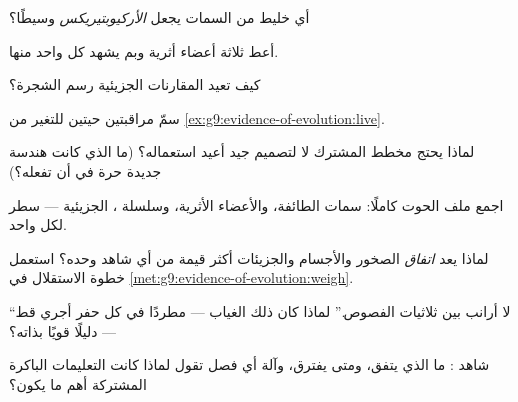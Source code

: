 \begin{exercise}[$\star$]\label{exo:g9:evidence-of-evolution:3}
أي خليط من السمات يجعل \emph{الأركيوبتيريكس} وسيطًا؟
\end{exercise}

\begin{exercise}[$\star$]\label{exo:g9:evidence-of-evolution:4}
أعط ثلاثة أعضاء أثرية وبم يشهد كل واحد منها.
\end{exercise}

\begin{exercise}[$\star$]\label{exo:g9:evidence-of-evolution:5}
كيف تعيد المقارنات الجزيئية رسم الشجرة؟
\end{exercise}

\begin{exercise}[$\star$]\label{exo:g9:evidence-of-evolution:6}
سمّ مراقبتين حيتين للتغير من
\cref{ex:g9:evidence-of-evolution:live}.
\end{exercise}

\begin{exercise}[$\star\star$]\label{exo:g9:evidence-of-evolution:7}
لماذا يحتج مخطط  المشترك  لا لتصميم جيد
أعيد استعماله؟ (ما الذي كانت هندسة جديدة حرة في أن
تفعله؟)
\end{exercise}

\begin{exercise}[$\star\star$]\label{exo:g9:evidence-of-evolution:8}
اجمع ملف الحوت كاملًا: سمات الطائفة، والأعضاء الأثرية،
وسلسلة ،  الجزيئية --- سطر لكل واحد.
\end{exercise}

\begin{exercise}[$\star\star$]\label{exo:g9:evidence-of-evolution:9}
لماذا يعد \emph{اتفاق} الصخور والأجسام والجزيئات أكثر
قيمة من أي شاهد وحده؟ استعمل خطوة الاستقلال في
\cref{met:g9:evidence-of-evolution:weigh}.
\end{exercise}

\begin{exercise}[$\star\star$]\label{exo:g9:evidence-of-evolution:10}
``لا أرانب بين ثلاثيات الفصوص.'' لماذا كان ذلك الغياب
--- مطردًا في كل حفر أجري قط --- دليلًا قويًا بذاته؟
\end{exercise}

\begin{exercise}[$\star\star$]\label{exo:g9:evidence-of-evolution:11}
شاهد : ما الذي يتفق، ومتى يفترق، وآلة أي فصل تقول
لماذا كانت التعليمات الباكرة المشتركة أهم ما يكون؟
\end{exercise}

